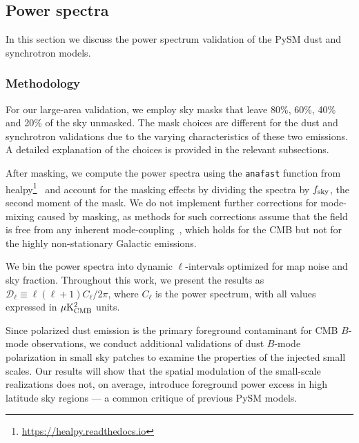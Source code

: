 \documentclass[twocolumn]{aastex631}
\begin{document}
\subsection{Power spectra}
\label{sec:PS-validation}
In this section we discuss the power spectrum validation of the PySM dust and synchrotron models. 

\subsubsection{Methodology}
For our large-area validation, we employ sky masks that leave 80\%, 60\%, 40\% and 20\% of the sky unmasked. The mask choices are different for the dust and synchrotron validations due to the varying characteristics of these two emissions. A detailed explanation of the choices is provided in the relevant subsections. 

After masking, we compute the power spectra using the \texttt{anafast} function from healpy\footnote{\url{https://healpy.readthedocs.io}}~\citep{Zonca:2019} and account for the masking effects by dividing the spectra by $f_{\rm sky}$, the second moment of the mask. We do not implement further corrections for mode-mixing caused by masking, as methods for such corrections assume that the field is free from any inherent mode-coupling~\citep[e.g.,][]{Hivon:2002}, which holds for the CMB but not for the highly non-stationary Galactic emissions. 

We bin the power spectra into dynamic $\ell$-intervals optimized for map noise and sky fraction. Throughout this work, we present the results as $\mathcal{D}_\ell \equiv \ell(\ell + 1) C_\ell / 2\pi$, where $C_\ell$ is the power spectrum, with all values expressed in $\mu{\rm K^2_{CMB}}$ units. 

Since polarized dust emission is the primary foreground contaminant for CMB $B$-mode observations, we conduct additional validations of dust $B$-mode polarization in small sky patches to examine the properties of the injected small scales. Our results will show that the spatial modulation of the small-scale realizations does not, on average, introduce foreground power excess in high latitude sky regions --- a common critique of previous PySM models. 
\end{document}
